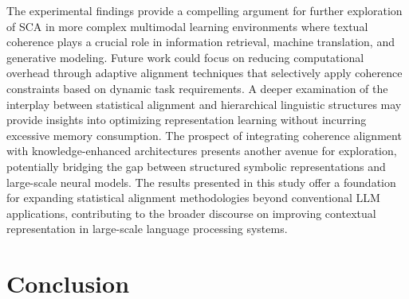 \documentclass{article}
\begin{document}
The experimental findings provide a compelling argument for further exploration of SCA in more complex multimodal learning environments where textual coherence plays a crucial role in information retrieval, machine translation, and generative modeling. Future work could focus on reducing computational overhead through adaptive alignment techniques that selectively apply coherence constraints based on dynamic task requirements. A deeper examination of the interplay between statistical alignment and hierarchical linguistic structures may provide insights into optimizing representation learning without incurring excessive memory consumption. The prospect of integrating coherence alignment with knowledge-enhanced architectures presents another avenue for exploration, potentially bridging the gap between structured symbolic representations and large-scale neural models. The results presented in this study offer a foundation for expanding statistical alignment methodologies beyond conventional LLM applications, contributing to the broader discourse on improving contextual representation in large-scale language processing systems.





\section{Conclusion}
\end{document}
